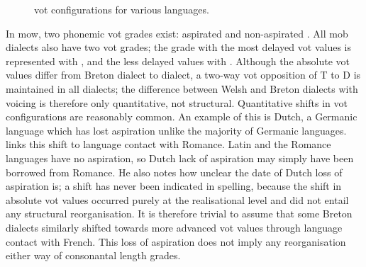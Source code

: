 \begin{figure}[h]
  \centering
  \caption{\Gls{vot} configurations for various languages.}
  \label{fig:votvarlang}
\end{figure}

In \gls{mow}, two phonemic \gls{vot} grades exist: aspirated  and non-aspirated . All \gls{mob} dialects also have two \gls{vot} grades; the grade with the most delayed \gls{vot} values is represented with , and the less delayed values with . Although the absolute \gls{vot} values differ from Breton dialect to dialect, a two-way \gls{vot} opposition of \gls{T} to \gls{D} is maintained in all dialects; the difference between Welsh and Breton dialects with voicing is therefore only quantitative, not structural. Quantitative shifts in \gls{vot} configurations are reasonably common. An example of this is Dutch, a Germanic language which has lost aspiration unlike the majority of Germanic languages. \Textcite[122--123]{Sch_Language14} links this shift to language contact with Romance. Latin and the Romance languages have no aspiration, so Dutch lack of aspiration may simply have been borrowed from Romance. He also notes how unclear the date of Dutch loss of aspiration is; a shift has never been indicated in spelling, because the shift in absolute \gls{vot} values occurred purely at the realisational level and did not entail any structural reorganisation. It is therefore trivial to assume that some Breton dialects similarly shifted towards more advanced \gls{vot} values through language contact with French. This loss of aspiration does not imply any reorganisation either way of consonantal length grades.

